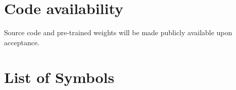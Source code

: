 \documentclass[final,5p,times,twocolumn,authoryear]{elsarticle}
\theoremstyle{plain}
\theoremstyle{remark}
\begin{document}
\section*{Code availability}
Source code and pre-trained weights will be made publicly available
upon acceptance.



\appendix

\section{List of Symbols}
\label{app:notation}
\end{document}
